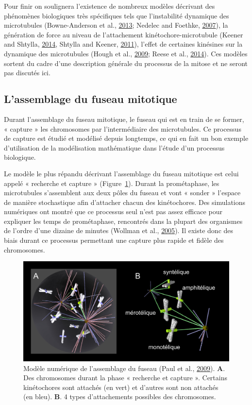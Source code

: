 \documentclass[12pt,a4paper,twoside,openright]{book}
\begin{document}
Pour finir on soulignera l'existence de nombreux modèles décrivant des
phénomènes biologiques très spécifiques tels que l'instabilité dynamique
des microtubules (Bowne-Anderson et al.,
\hyperref[ref-Bowne-Anderson2013]{2013}; Nedelec and Foethke,
\hyperref[ref-Nedelec2007]{2007}), la génération de force au niveau de
l'attachement kinétochore-microtubule (Keener and Shtylla,
\hyperref[ref-Keener2014]{2014}, Shtylla and Keener,
\hyperref[ref-Shtylla2011]{2011}), l'effet de certaines kinésines sur la
dynamique des microtubules (Hough et al.,
\hyperref[ref-Hough2009]{2009}; Reese et al.,
\hyperref[ref-Reese2014]{2014}). Ces modèles sortent du cadre d'une
description générale du processus de la mitose et ne seront pas discutés
ici.

\subsection{L'assemblage du fuseau
mitotique}\label{lassemblage-du-fuseau-mitotique}

Durant l'assemblage du fuseau mitotique, le fuseau qui est en train de
se former, « capture » les chromosomes par l'intermédiaire des
microtubules. Ce processus de capture est étudié et modélisé depuis
longtemps, ce qui en fait un bon exemple d'utilisation de la
modélisation mathématique dans l'étude d'un processus biologique.

Le modèle le plus répandu décrivant l'assemblage du fuseau mitotique est
celui appelé « recherche et capture » (Figure~\ref{fig:mogilner}).
Durant la prométaphase, les microtubules s'assemblent aux deux pôles du
fuseau et vont « sonder » l'espace de manière stochastique afin
d'attacher chacun des kinétochores. Des simulations numériques ont
montré que ce processus seul n'est pas assez efficace pour expliquer les
temps de prométaphase, rencontrés dans la plupart des organismes de
l'ordre d'une dizaine de minutes (Wollman et al.,
\hyperref[ref-Wollman2005]{2005}). Il existe donc des biais durant ce
processus permettant une capture plus rapide et fidèle des chromosomes.

\begin{figure}[htbp]
\centering
\includegraphics{figures/intro/mogilner.png}
\caption[Modèle numérique de l'assemblage du fuseau]{\label{fig:mogilner}Modèle
numérique de l'assemblage du fuseau (Paul et al.,
\hyperref[ref-Paul2009]{2009}). \textbf{A}. Des chromosomes durant la
phase « recherche et capture ». Certains kinétochores sont attachés (en
vert) et d'autres sont non attachés (en bleu). \textbf{B}. 4 types
d'attachements possibles des chromosomes.}
\end{figure}
\end{document}
